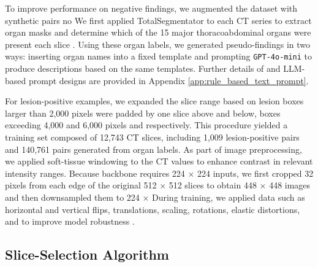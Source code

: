 \documentclass[bioengineering,article,submit,pdftex,moreauthors]{Definitions/mdpi}
\begin{document}
To improve performance on negative findings, we augmented the dataset with synthetic  pairs  no  
We first applied TotalSegmentator to each CT series to extract organ masks and determine which of the 15 major thoracoabdominal organs were present  each slice \cite{wasserthal_totalsegmentator_2023}. 
Using these organ labels, we generated pseudo-findings in two ways:  inserting organ names into a fixed template and  prompting \texttt{GPT-4o-mini} to produce  descriptions based on the same templates. 
Further details of   and LLM-based prompt designs are provided in Appendix \ref{app:rule_based_text_prompt}.


For lesion-positive examples, we expanded the slice range based on lesion   boxes larger than 2,000 pixels were padded by one slice above and below,  boxes exceeding 4,000 and 6,000 pixels   and   respectively. 
This procedure yielded a training set composed of 12,743 CT slices, including 1,009 lesion-positive  pairs and 140,761  pairs generated from organ labels.
As part of image preprocessing, we applied soft-tissue windowing to the CT values to enhance contrast in relevant intensity ranges. 
Because  backbone requires 224 × 224 inputs, we first cropped 32 pixels from each edge of the original 512 × 512 slices to obtain 448 × 448 images and then downsampled them to 224 ×  
During training, we applied data  such as horizontal and vertical flips, translations, scaling, rotations, elastic distortions, and  to improve model robustness \cite{devries_improved_2017}.


\subsection{Slice-Selection Algorithm}  
\end{document}
